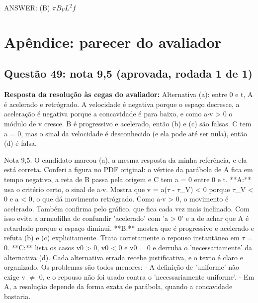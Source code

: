 \documentclass{article}%
\begin{document}
ANSWER: (B) $\pi B_V L^2 f$%
\newpage%
\section*{Apêndice: parecer do avaliador}%
\subsection*{Questão 49: nota 9,5 (aprovada, rodada 1 de 1)}%
\textbf{Resposta da resolução às cegas do avaliador:} Alternativa (a): entre 0 e t, A é acelerado e retrógrado. A velocidade é negativa porque o espaço decresce, a aceleração é negativa porque a concavidade é para baixo, e como a$\cdot$v > 0 o módulo de v cresce. B é progressivo e acelerado, então (b) e (c) são falsas. C tem a = 0, mas o sinal da velocidade é desconhecido (e ela pode até ser nula), então (d) é falsa.\par %
Nota 9,5. O candidato marcou (a), a mesma resposta da minha referência, e ela está correta. Conferi a figura no PDF original: o vértice da parábola de A fica em tempo negativo, a reta de B passa pela origem e C tem a = 0 entre 0 e t.\newline%
\newline%
**A:** usa o critério certo, o sinal de a$\cdot$v. Mostra que v = a($\tau$ - $\tau$\_V) < 0 porque $\tau$\_V < 0 e a < 0, o que dá movimento retrógrado. Como a$\cdot$v > 0, o movimento é acelerado. Também confirma pelo gráfico, que fica cada vez mais inclinado. Com isso evita a armadilha de confundir 'acelerado' com 'a > 0' e a de achar que A é retardado porque o espaço diminui.\newline%
\newline%
**B:** mostra que é progressivo e acelerado e refuta (b) e (c) explicitamente. Trata corretamente o repouso instantâneo em $\tau$ = 0.\newline%
\newline%
**C:** lista os casos v0 > 0, v0 < 0 e v0 = 0 e derruba o 'necessariamente' da alternativa (d).\newline%
\newline%
Cada alternativa errada recebe justificativa, e o texto é claro e organizado. Os problemas são todos menores:\newline%
{-} A definição de 'uniforme' não exige v $\neq$ 0, e o repouso não foi usado contra o 'necessariamente uniforme'.\newline%
{-} Em A, a resolução depende da forma exata de parábola, quando a concavidade bastaria.\newline%
\end{document}
